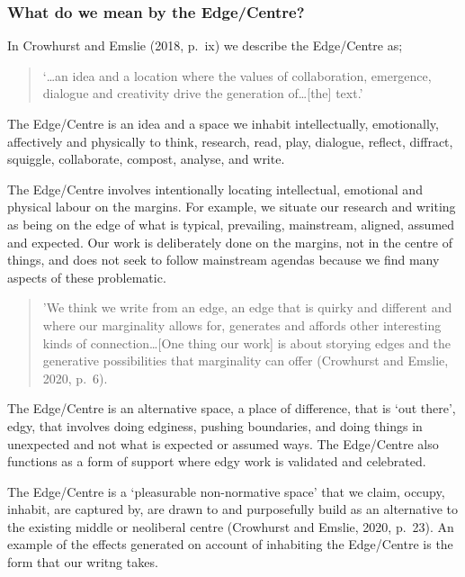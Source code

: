 \documentclass[
]{article}
\begin{document}
\hypertarget{what-do-we-mean-by-the-edgecentre}{%
\subsubsection{What do we mean by the
Edge/Centre?}\label{what-do-we-mean-by-the-edgecentre}}

In Crowhurst and Emslie (2018, p.~ix) we describe the Edge/Centre as;

\begin{quote}
`\ldots an idea and a location where the values of collaboration,
emergence, dialogue and creativity drive the generation
of\ldots{[}the{]} text.'
\end{quote}

The Edge/Centre is an idea and a space we inhabit intellectually,
emotionally, affectively and physically to think, research, read, play,
dialogue, reflect, diffract, squiggle, collaborate, compost, analyse,
and write.

The Edge/Centre involves intentionally locating intellectual, emotional
and physical labour on the margins. For example, we situate our research
and writing as being on the edge of what is typical, prevailing,
mainstream, aligned, assumed and expected. Our work is deliberately done
on the margins, not in the centre of things, and does not seek to follow
mainstream agendas because we find many aspects of these problematic.

\begin{quote}
'We think we write from an edge, an edge that is quirky and different
and where our marginality allows for, generates and affords other
interesting kinds of connection\ldots{[}One thing our work{]} is about
storying edges and the generative possibilities that marginality can
offer (Crowhurst and Emslie, 2020, p.~6).
\end{quote}

The Edge/Centre is an alternative space, a place of difference, that is
`out there', edgy, that involves doing edginess, pushing boundaries, and
doing things in unexpected and not what is expected or assumed ways. The
Edge/Centre also functions as a form of support where edgy work is
validated and celebrated.

The Edge/Centre is a `pleasurable non-normative space' that we claim,
occupy, inhabit, are captured by, are drawn to and purposefully build as
an alternative to the existing middle or neoliberal centre (Crowhurst
and Emslie, 2020, p.~23). An example of the effects generated on account
of inhabiting the Edge/Centre is the form that our writng takes.
\end{document}
